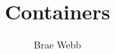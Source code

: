 \documentclass{csse4400}
\title{Containers}
\author{Brae Webb}
\date{\week{4}}
\begin{document}
\makecover






\end{document}
